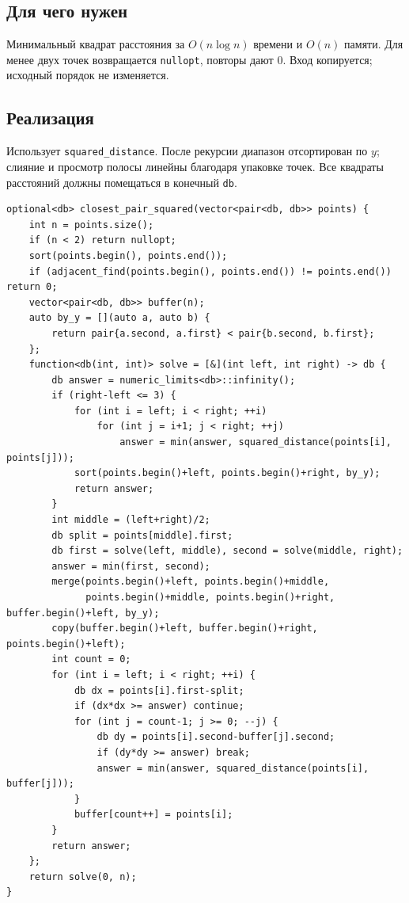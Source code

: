 \subsection*{Для чего нужен}
Минимальный квадрат расстояния за $O(n\log n)$ времени и $O(n)$ памяти.
Для менее двух точек возвращается \texttt{nullopt}, повторы дают $0$.
Вход копируется; исходный порядок не изменяется.
\subsection*{Реализация}
Использует \texttt{squared\_distance}. После рекурсии диапазон отсортирован
по $y$; слияние и просмотр полосы линейны благодаря упаковке точек.
Все квадраты расстояний должны помещаться в конечный \texttt{db}.
\begin{lstlisting}[name=geometry_closest]
optional<db> closest_pair_squared(vector<pair<db, db>> points) {
    int n = points.size();
    if (n < 2) return nullopt;
    sort(points.begin(), points.end());
    if (adjacent_find(points.begin(), points.end()) != points.end()) return 0;
    vector<pair<db, db>> buffer(n);
    auto by_y = [](auto a, auto b) {
        return pair{a.second, a.first} < pair{b.second, b.first};
    };
    function<db(int, int)> solve = [&](int left, int right) -> db {
        db answer = numeric_limits<db>::infinity();
        if (right-left <= 3) {
            for (int i = left; i < right; ++i)
                for (int j = i+1; j < right; ++j)
                    answer = min(answer, squared_distance(points[i], points[j]));
            sort(points.begin()+left, points.begin()+right, by_y);
            return answer;
        }
        int middle = (left+right)/2;
        db split = points[middle].first;
        db first = solve(left, middle), second = solve(middle, right);
        answer = min(first, second);
        merge(points.begin()+left, points.begin()+middle,
              points.begin()+middle, points.begin()+right, buffer.begin()+left, by_y);
        copy(buffer.begin()+left, buffer.begin()+right, points.begin()+left);
        int count = 0;
        for (int i = left; i < right; ++i) {
            db dx = points[i].first-split;
            if (dx*dx >= answer) continue;
            for (int j = count-1; j >= 0; --j) {
                db dy = points[i].second-buffer[j].second;
                if (dy*dy >= answer) break;
                answer = min(answer, squared_distance(points[i], buffer[j]));
            }
            buffer[count++] = points[i];
        }
        return answer;
    };
    return solve(0, n);
}
\end{lstlisting}
